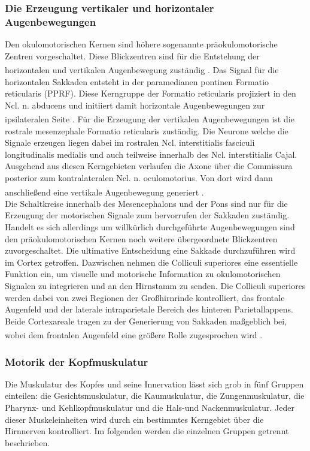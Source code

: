 \documentclass[12pt,a4paper,pdftex]{article}
\begin{document}
\subsubsection*{Die Erzeugung vertikaler und horizontaler Augenbewegungen}
Den okulomotorischen Kernen sind höhere sogenannte präokulomotorische Zentren vorgeschaltet. Diese Blickzentren sind für die Entstehung der horizontalen und vertikalen Augenbewegung zuständig \textsuperscript{\cite[6]{trepel2011neuroanatomie}}.   
Das Signal für die horizontalen Sakkaden entsteht in der paramedianen pontinen Formatio reticularis (PPRF). Diese Kerngruppe der Formatio reticularis projiziert in den Ncl. n. abducens und initiiert damit horizontale Augenbewegungen zur ipsilateralen Seite \textsuperscript{\cite[39]{kandel2013principles}}. Für die Erzeugung der vertikalen Augenbewegungen ist die rostrale mesenzephale Formatio reticularis zuständig. Die Neurone welche die Signale erzeugen liegen dabei im rostralen Ncl. interstitialis fasciculi longitudinalis medialis und auch teilweise innerhalb des Ncl. interstitialis Cajal. Ausgehend aus diesen Kerngebieten verlaufen die Axone über die Commissura posterior zum kontralateralen Ncl. n. oculomotorius. Von dort wird dann anschließend eine vertikale Augenbewegung generiert \textsuperscript{\cite[6]{trepel2011neuroanatomie}}. \\      
Die Schaltkreise innerhalb des Mesencephalons und der Pons sind nur für die Erzeugung der motorischen Signale zum hervorrufen der Sakkaden zuständig. Handelt es sich allerdings um willkürlich durchgeführte Augenbewegungen sind den präokulomotorischen Kernen noch weitere übergeordnete Blickzentren zuvorgeschaltet. Die ultimative Entscheidung eine Sakkade durchzuführen wird im Cortex getroffen. Dazwischen nehmen die Colliculi superiores eine essentielle Funktion ein, um visuelle und motorische Information zu okulomotorischen Signalen zu integrieren und an den Hirnstamm zu senden. Die Colliculi superiores werden dabei von zwei Regionen der Großhirnrinde kontrolliert, das frontale Augenfeld und der laterale intraparietale Bereich des hinteren Parietallappens. Beide Cortexareale tragen zu der Generierung von Sakkaden maßgeblich bei, wobei dem frontalen Augenfeld eine größere Rolle zugesprochen wird \textsuperscript{\cite[39]{kandel2013principles}}.             

\subsubsection{Motorik der Kopfmuskulatur}
Die Muskulatur des Kopfes und seine Innervation lässt sich grob in fünf Gruppen einteilen: die Gesichtsmuskulatur, die Kaumuskulatur, die Zungenmuskulatur, die Pharynx- und Kehlkopfmuskulatur und die Hals-und Nackenmuskulatur. Jeder dieser Muskeleinheiten wird durch ein bestimmtes Kerngebiet über die Hirnnerven kontrolliert. Im folgenden werden die einzelnen Gruppen getrennt beschrieben.
\end{document}
